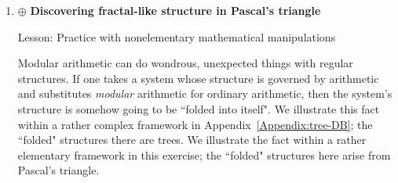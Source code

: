 \begin{enumerate}
\medskip\item
$\oplus$
{\bf Discovering fractal-like structure in Pascal's triangle}

{\sc Lesson:} Practice with nonelementary mathematical manipulations

\smallskip


Modular arithmetic can do wondrous, unexpected things with regular structures.  If one takes a system whose structure is governed by arithmetic and substitutes {\em modular} arithmetic for ordinary arithmetic, then the system's structure is somehow going to be ``folded into itself".  We illustrate this fact within a rather complex framework in Appendix~\ref{Appendix:tree-DB}; the ``folded" structures there are trees.  We illustrate the fact within a rather elementary framework in this exercise; the ``folded" structures here arise from Pascal's triangle.

\medskip


\end{enumerate}
